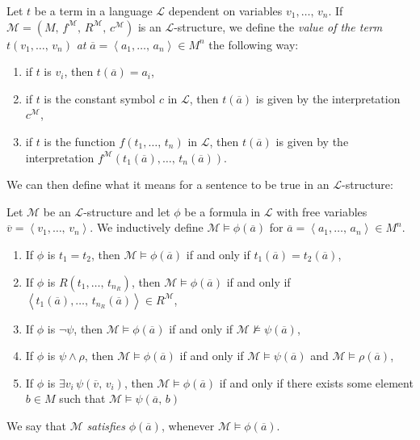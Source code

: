 \documentclass[../../main.tex]{subfiles}
\begin{document}
\begin{definition}\cite[Definition 1.3.13]{Cha90}
    Let $t$ be a term in a language $\mathcal{L}$ dependent on variables $v_1,\ldots,\, v_n$.
    If $\mathcal{M} = \left(M,\, f^{\mathcal{M}},\, R^{\mathcal{M}},\, c^{\mathcal{M}}\right)$ is an $\mathcal{L}$-structure,
    we define the \textit{value of the term} $t(v_1,\ldots,\, v_n)$ \textit{at} $\overline{a} = \left<a_1,\ldots,\, a_n\right> \in M^n$ the following way:
    \begin{enumerate}
        \item if $t$ is $v_i$, then $t(\overline{a}) = a_i$,
        \item if $t$ is the constant symbol $c$ in $\mathcal{L}$, 
        then $t(\overline{a})$ is given by the interpretation $c^{\mathcal{M}}$,
        \item if $t$ is the function $f(t_1,\ldots,\, t_n)$ in $\mathcal{L}$,
        then $t(\overline{a})$ is given by the interpretation 
        $f^{\mathcal{M}}(t_1(\overline{a}),\ldots,\, t_n(\overline{a}))$.
    \end{enumerate}
\end{definition}

We can then define what it means for a sentence to be true in an $\mathcal{L}$-structure:
\begin{definition}\label{model-satisfaction-def}\cite[Definition 1.1.6]{Mar02}
    Let $\mathcal{M}$ be an $\mathcal{L}$-structure and let $\phi$ be a formula in $\mathcal{L}$ with free variables $\overline{v} = \left<v_1,\ldots,\, v_n\right>$.
    We inductively define $\mathcal{M} \models \phi(\overline{a})$ for $\overline{a} = \left<a_1,\ldots,\, a_n\right> \in M^n$.

    \begin{enumerate}
        \item If $\phi$ is $t_1 = t_2$,
        then $\mathcal{M} \models \phi(\overline{a})$ if and only if $t_1(\overline{a}) = t_2(\overline{a})$, 
        \item If $\phi$ is $R\left(t_1,\ldots,\, t_{n_R}\right)$,
        then $\mathcal{M} \models \phi(\overline{a})$ if and only if $\left<t_1(\overline{a}),\ldots,\, t_{n_R}(\overline{a})\right> \in R^{\mathcal{M}}$,
        \item If $\phi$ is $\lnot \psi$, 
        then $\mathcal{M} \models \phi(\overline{a})$ if and only if $\mathcal{M} \not\models \psi(\overline{a})$,
        \item If $\phi$ is $\psi \wedge \rho$, 
        then $\mathcal{M} \models \phi(\overline{a})$ if and only if $\mathcal{M} \models \psi(\overline{a})$ and $\mathcal{M} \models \rho(\overline{a})$,
        \item If $\phi$ is $\exists v_i\, \psi(\overline{v},\, v_i)$,
        then $\mathcal{M} \models \phi(\overline{a})$ if and only if there exists some element $b \in M$ such that $\mathcal{M} \models \psi(\overline{a},\, b)$
    \end{enumerate}

    We say that $\mathcal{M}$ \textit{satisfies} $\phi(\overline{a})$, whenever $\mathcal{M} \models \phi(\overline{a})$.
\end{definition}
\end{document}

